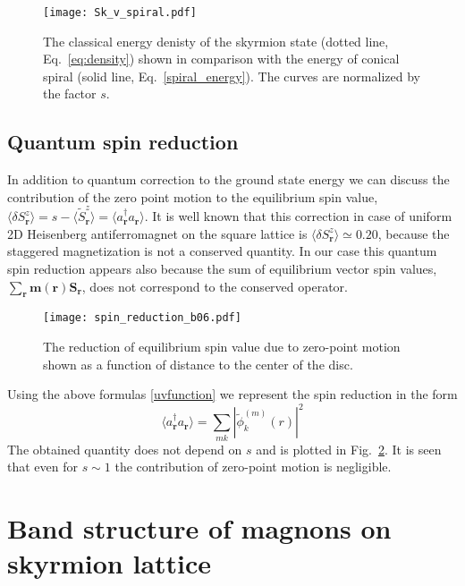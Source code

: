\documentclass[aps,prb,twocolumn,superscriptaddress,nobalancelastpage]{revtex4-1}
\begin{document}
\begin{figure}[t]
\texttt{[image: Sk\_v\_spiral.pdf]}
\caption{The classical energy denisty of the skyrmion state (dotted line, Eq.\ \eqref{eq:density}) shown in comparison with the energy of conical spiral (solid line, Eq.\ \eqref{spiral_energy}). The curves are normalized by the factor $s$.  }
\label{fig:Sk_v_spiral}
\end{figure}

\subsection{Quantum spin reduction
\label{sec:reduction}}

In addition to quantum correction to the ground state energy we can discuss the contribution of the zero point motion to the equilibrium spin value, $\langle \delta S^{z} _{\mathbf{r} } \rangle = s - \langle \tilde S^{z}  _{\mathbf{r} }\rangle = \langle a^{\dagger} _{\mathbf{r} } a _{\mathbf{r} }\rangle $.  It is well known that this correction in case of uniform 2D Heisenberg antiferromagnet on the square lattice is $\langle \delta S^{z} _{\mathbf{r} } \rangle \simeq 0.20$, because the staggered magnetization is not a conserved quantity.  In our case this quantum spin reduction appears also because the sum of equilibrium vector spin values, $\sum_{\mathbf{r}} \mathbf{m} (\mathbf{r}) \mathbf{S}_{\mathbf{r}}$, does not correspond to the conserved operator. 

\begin{figure}[t]
\texttt{[image: spin\_reduction\_b06.pdf]}
\caption{The reduction of equilibrium spin value due to zero-point motion shown as a function of distance to the center of the disc. }
\label{fig:spin_reduction}
\end{figure}

Using the above formulas \eqref{uvfunction} we represent the spin reduction in the form 
\begin{equation}
\langle a^{\dagger} _{\mathbf{r} } a _{\mathbf{r} }\rangle  = 
\sum_{mk} \left | {\tilde \phi}_{k}^{(m)}( r )  \right|^{2}
\end{equation}
The obtained quantity does not depend on $s$ and is plotted in Fig.\ \ref{fig:spin_reduction}. It is seen that even for $s\sim1$ the contribution of zero-point motion is negligible. 

\section{Band structure of magnons  on skyrmion lattice
\label{sec:bands}}
\end{document}
